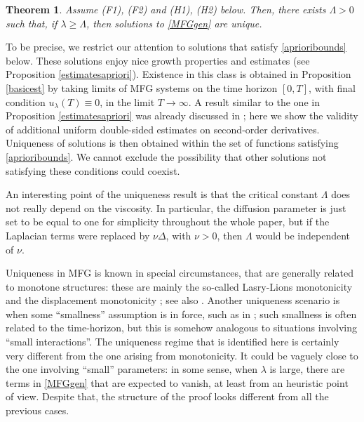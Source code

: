 \documentclass{amsart}
\newtheorem*{thm*}{Theorem}
\theoremstyle{remark}
\theoremstyle{definition}
\theoremstyle{Claim}
\theoremstyle{plain}
\begin{document}
	\begin{thm*} Assume (F1), (F2) and (H1), (H2) below. Then, there exists $\Lambda > 0$ such that, if $\lambda \ge \Lambda$, then solutions to \eqref{MFGgen} are unique.
	\end{thm*}
	
	To be precise, we restrict our attention to solutions that satisfy \eqref{aprioribounds} below. These solutions enjoy nice growth properties and estimates (see Proposition \ref{estimatesapriori}). Existence in this class is obtained in Proposition \ref{basicest} by taking limits of MFG systems on the time horizon $[0,T]$, with final condition $u_\lambda(T) \equiv0$, in the limit $T \to \infty$. A result similar to the one in Proposition \ref{estimatesapriori} was already discussed in \cite{BC}; here we show the validity of additional uniform double-sided estimates on second-order derivatives. Uniqueness of solutions is then obtained within the set of functions satisfying \eqref{aprioribounds}. We cannot exclude the possibility that other solutions not satisfying these conditions could coexist.
	
	An interesting point of the uniqueness result is that the critical constant $\Lambda$ does not really depend on the viscosity. In particular, the diffusion parameter is just set to be equal to one for simplicity throughout the whole paper, but if the Laplacian terms were replaced by $\nu \Delta$, with $\nu > 0$, then $\Lambda$ would be independent of $\nu$.
	
	Uniqueness in MFG is known in special circumstances, that are generally related to monotone structures: these are mainly the so-called Lasry-Lions monotonicity \cite{LL07} and the displacement monotonicity \cite{MesMou}; see also \cite{MouZhang, BM24, GraMe}. Another uniqueness scenario is when some ``smallness'' assumption is in force, such as in \cite{BC18, BF, AM, CCDE}; such smallness is often related to the time-horizon, but this is somehow analogous to situations involving ``small interactions''. The uniqueness regime that is identified here is certainly very different from the one arising from monotonicity. It could be vaguely close to the one involving ``small'' parameters: in some sense, when $\lambda$ is large, there are terms in \eqref{MFGgen} that are expected to vanish, at least from an heuristic point of view. Despite that, the structure of the proof looks different from all the previous cases. 
	
\end{document}
